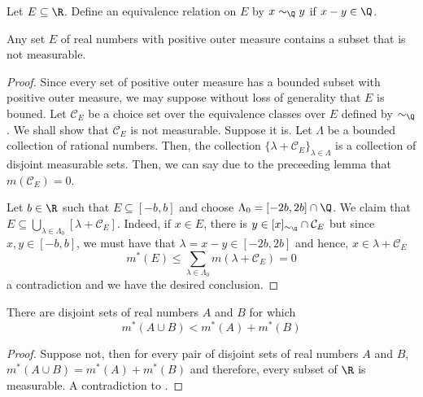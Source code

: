 \begin{definition}
    Let $E\subseteq\R$. Define an equivalence relation on $E$ by $x\sim_{\Q} y$ if $x - y\in\Q$.
\end{definition}

\begin{theorem}[Vitali]
    Any set $E$ of real numbers with positive outer measure contains a subset that is not measurable.
\end{theorem}
\begin{proof}
    Since every set of positive outer measure has a bounded subset with positive outer measure, we may suppose without loss of generality that $E$ is bouned. Let $\mathcal C_E$ be a choice set over the equivalence classes over $E$ defined by $\sim_{\Q}$. We shall show that $\mathcal C_E$ is not measurable. Suppose it is. Let $\Lambda$ be a bounded collection of rational numbers. Then, the collection $\{\lambda + \mathcal C_E\}_{\lambda\in\Lambda}$ is a collection of disjoint measurable sets. Then, we can say due to the preceeding lemma that $m(\mathcal C_E) = 0$.

    Let $b\in\R$ such that $E\subseteq[-b,b]$ and choose $\Lambda_0 = [-2b,2b]\cap\Q$. We claim that $E\subseteq\bigcup_{\lambda\in\Lambda_0}[\lambda + \mathcal C_E]$. Indeed, if $x\in E$, there is $y\in[x]_{\sim_{\Q}}\cap\mathcal C_E$ but since $x,y\in [-b,b]$, we must have that $\lambda = x - y\in [-2b, 2b]$ and hence, $x\in\lambda + \mathcal C_E$
    \begin{equation*}
        m^*(E)\le\sum_{\lambda\in\Lambda_0} m(\lambda + \mathcal C_E) = 0
    \end{equation*}
    a contradiction and we have the desired conclusion.
\end{proof}

\begin{corollary}
    There are disjoint sets of real numbers $A$ and $B$ for which 
    \begin{equation*}
        m^*(A\cup B) < m^*(A) + m^*(B)
    \end{equation*}
\end{corollary}
\begin{proof}
    Suppose not, then for every pair of disjoint sets of real numbers $A$ and $B$, $m^*(A\cup B) = m^*(A) + m^*(B)$ and therefore, every subset of $\R$ is measurable. A contradiction to .
\end{proof}

